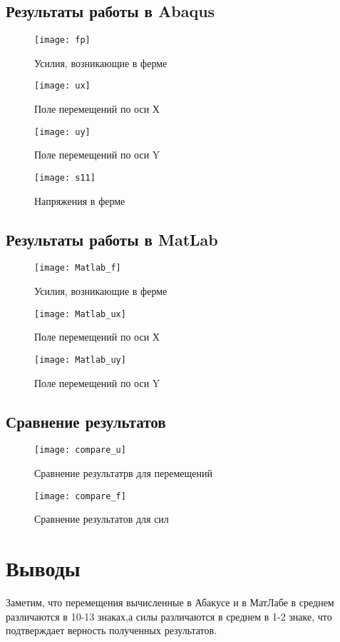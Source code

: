 \documentclass[12pt,a4paper]{article}
\begin{document}
\subsection{Результаты работы в Abaqus}
\begin{figure}[H]
	\centering
	\texttt{[image: fp]}
	\caption{Усилия, возникающие в ферме}
	\label{pic1}
\end{figure}
\begin{figure}[H]
	\centering
	\texttt{[image: ux]}
	\caption{Поле перемещений по оси Х}
	\label{pic2}
\end{figure}
\begin{figure}[H]
	\centering
	\texttt{[image: uy]}
	\caption{Поле перемещений по оси Y}
	\label{pic3}
\end{figure}
\begin{figure}[H]
	\centering
	\texttt{[image: s11]}
	\caption{Напряжения в ферме}
	\label{pic3}
\end{figure}
\subsection{Результаты работы в MatLab}
\begin{figure}[H]
	\centering
	\texttt{[image: Matlab\_f]}
	\caption{Усилия, возникающие в ферме}
	\label{pic1}
\end{figure}
\begin{figure}[H]
	\centering
	\texttt{[image: Matlab\_ux]}
	\caption{Поле перемещений по оси Х}
	\label{pic2}
\end{figure}
\begin{figure}[H]
	\centering
	\texttt{[image: Matlab\_uy]}
	\caption{Поле перемещений по оси Y}
	\label{pic3}
\end{figure}
\subsection{Сравнение результатов}
\begin{figure}[H]
	\centering
	\texttt{[image: compare\_u]}
	\caption{Сравнение результатрв для перемещений}
	\label{pic7}
\end{figure}
\begin{figure}[H]
	\centering
	\texttt{[image: compare\_f]}
	\caption{Сравнение результатов для сил}
	\label{pic8}
\end{figure}
\section*{Выводы}
Заметим, что  перемещения вычисленные в Абакусе и в МатЛабе в среднем различаются в 10-13 знаках,а силы различаются в среднем в 1-2 знаке, что подтверждает верность полученных результатов.
\end{document}
